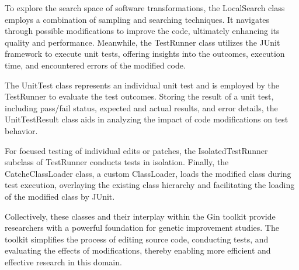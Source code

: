 To explore the search space of software transformations, the LocalSearch class employs a combination of sampling and searching techniques. It navigates through possible modifications to improve the code, ultimately enhancing its quality and performance. Meanwhile, the TestRunner class utilizes the JUnit framework to execute unit tests, offering insights into the outcomes, execution time, and encountered errors of the modified code.\par

The UnitTest class represents an individual unit test and is employed by the TestRunner to evaluate the test outcomes. Storing the result of a unit test, including pass/fail status, expected and actual results, and error details, the UnitTestResult class aids in analyzing the impact of code modifications on test behavior.\par

For focused testing of individual edits or patches, the IsolatedTestRunner subclass of TestRunner conducts tests in isolation. Finally, the CatcheClassLoader class, a custom ClassLoader, loads the modified class during test execution, overlaying the existing class hierarchy and facilitating the loading of the modified class by JUnit.\par

Collectively, these classes and their interplay within the Gin toolkit provide researchers with a powerful foundation for genetic improvement studies. The toolkit simplifies the process of editing source code, conducting tests, and evaluating the effects of modifications, thereby enabling more efficient and effective research in this domain.\par
